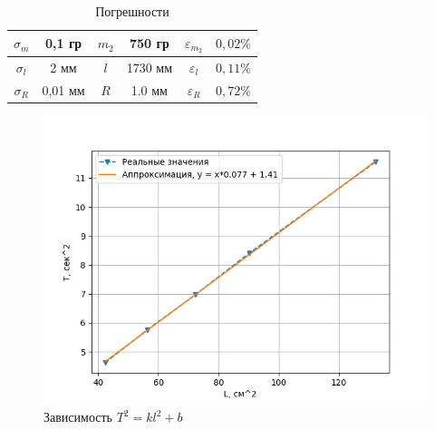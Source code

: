 \documentclass[a4paper]{article}
\begin{document}
\begin{table}[h!]
\begin{center}
\begin{tabular}{|c|c|c|c|c|c|}
\hline
$\sigma_{m}$ & 0,1 гр   & $m_{2}$ & 750 гр    & $\varepsilon_{m_{2}}$ & $0,02\%$  \\ \hline
$\sigma_{l}$ & 2 мм   & $l$ & 1730 мм    & $\varepsilon_{l}$ & $0,11\%$  \\ \hline
$\sigma_{R}$ & 0,01 мм   & $R$ & 1.0 мм    & $\varepsilon_{R}$ & $0,72\%$  \\ \hline
\end{tabular}
\caption{Погрешности}
\end{center}
\end{table}

\begin{figure}[p]
    \centering
    \includegraphics[scale=1.2]{rot2.png}
    \caption{Зависимость $T^2 = kl^2 + b$}
\end{figure}
\end{document}
